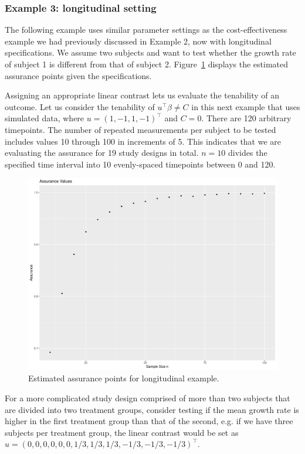 \subsubsection{Example 3: longitudinal setting}
The following example uses similar parameter settings as 
the cost-effectiveness example we had previously discussed
in Example 2, 
now with 
longitudinal specifications. We assume two subjects and
want to test whether the growth rate of subject 1
is different from that of subject 2. 
Figure~\ref{fig:ex3} displays the estimated assurance points
given the specifications. 

Assigning an appropriate linear contrast
lets us evaluate the tenability of an outcome. 
Let us consider the tenability of 
$u^{\top}\beta \neq C$ in this next example that uses
simulated data, where
$u = (1, -1, 1, -1)^{\top}$ and $C = 0$. 
There are 120 arbitrary timepoints.
The number of repeated measurements per subject
to be tested includes values 10 through 100 in increments of 5. 
This indicates that we are evaluating
the assurance for 19 study designs in total. $n = 10$ 
divides the specified time interval 
into 10 evenly-spaced timepoints between 0 and 120.

\begin{figure}[t!]
\centering
\includegraphics[width = 8 cm]{ex3_assurplot.pdf}
\caption{\label{fig:ex3} Estimated assurance points for longitudinal example.}
\end{figure}

For a more complicated study design comprised of more
than two subjects that are divided into two treatment groups, 
consider testing if the mean growth rate is higher in 
the first treatment group than that of the second, 
e.g. if we have three subjects per treatment group, 
the linear contrast would be set as 
$u = (0, 0, 0, 0, 0, 0, 1/3, 1/3, 1/3, -1/3, -1/3, -1/3)^{\top}$.

